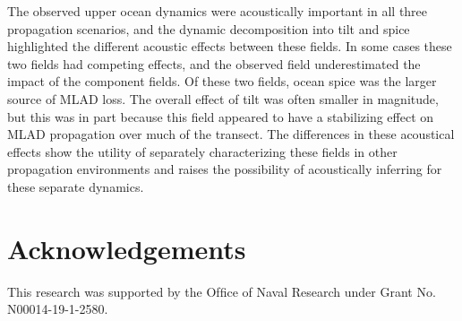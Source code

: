 \documentclass[preprint,NumberedRefs]{JASA}
\begin{document}
The observed upper ocean dynamics were acoustically important in all three propagation scenarios, and the dynamic decomposition into tilt and spice highlighted the different acoustic effects between these fields. In some cases these two fields had competing effects, and the observed field underestimated the impact of the component fields. Of these two fields, ocean spice was the larger source of MLAD loss. The overall effect of tilt was often smaller in magnitude, but this was in part because this field appeared to have a stabilizing effect on MLAD propagation over much of the transect. The differences in these acoustical effects show the utility of separately characterizing these fields in other propagation environments and raises the possibility of acoustically inferring for these separate dynamics.

\section*{Acknowledgements}
This research was supported by the Ofﬁce of Naval Research under Grant No. N00014-19-1-2580.
\end{document}
